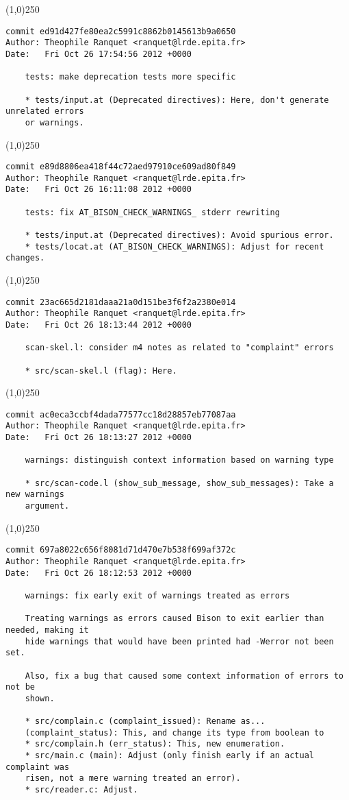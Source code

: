 \line(1,0){250}
\begin{verbatim}
commit ed91d427fe80ea2c5991c8862b0145613b9a0650
Author: Theophile Ranquet <ranquet@lrde.epita.fr>
Date:   Fri Oct 26 17:54:56 2012 +0000

    tests: make deprecation tests more specific
    
    * tests/input.at (Deprecated directives): Here, don't generate unrelated errors
    or warnings.

\end{verbatim}
\line(1,0){250}
\begin{verbatim}
commit e89d8806ea418f44c72aed97910ce609ad80f849
Author: Theophile Ranquet <ranquet@lrde.epita.fr>
Date:   Fri Oct 26 16:11:08 2012 +0000

    tests: fix AT_BISON_CHECK_WARNINGS_ stderr rewriting
    
    * tests/input.at (Deprecated directives): Avoid spurious error.
    * tests/locat.at (AT_BISON_CHECK_WARNINGS): Adjust for recent changes.

\end{verbatim}
\line(1,0){250}
\begin{verbatim}
commit 23ac665d2181daaa21a0d151be3f6f2a2380e014
Author: Theophile Ranquet <ranquet@lrde.epita.fr>
Date:   Fri Oct 26 18:13:44 2012 +0000

    scan-skel.l: consider m4 notes as related to "complaint" errors
    
    * src/scan-skel.l (flag): Here.

\end{verbatim}
\line(1,0){250}
\begin{verbatim}
commit ac0eca3ccbf4dada77577cc18d28857eb77087aa
Author: Theophile Ranquet <ranquet@lrde.epita.fr>
Date:   Fri Oct 26 18:13:27 2012 +0000

    warnings: distinguish context information based on warning type
    
    * src/scan-code.l (show_sub_message, show_sub_messages): Take a new warnings
    argument.

\end{verbatim}
\line(1,0){250}
\begin{verbatim}
commit 697a8022c656f8081d71d470e7b538f699af372c
Author: Theophile Ranquet <ranquet@lrde.epita.fr>
Date:   Fri Oct 26 18:12:53 2012 +0000

    warnings: fix early exit of warnings treated as errors
    
    Treating warnings as errors caused Bison to exit earlier than needed, making it
    hide warnings that would have been printed had -Werror not been set.
    
    Also, fix a bug that caused some context information of errors to not be
    shown.
    
    * src/complain.c (complaint_issued): Rename as...
    (complaint_status): This, and change its type from boolean to
    * src/complain.h (err_status): This, new enumeration.
    * src/main.c (main): Adjust (only finish early if an actual complaint was
    risen, not a mere warning treated an error).
    * src/reader.c: Adjust.

\end{verbatim}
